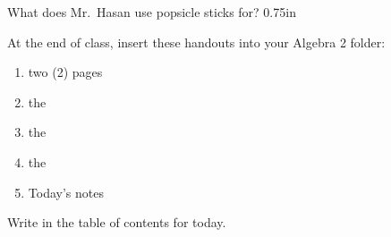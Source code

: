 {
    What does Mr.~Hasan use popsicle sticks for?
}
{0.75in}

\vfill
\begin{tcolorbox}[center, width=5.25in]
    At the end of class, insert these handouts into your Algebra 2 folder:
    \vspace{-0.5\onelineskip}
    \begin{enumerate}[nosep]
        \item two (2)  pages 
        \item the 
        \item the 
        \item the 
        \item Today's  notes
    \end{enumerate}
    \vspace{0.5\onelineskip}
    Write  in the table of contents for today.
\end{tcolorbox}
\vfill